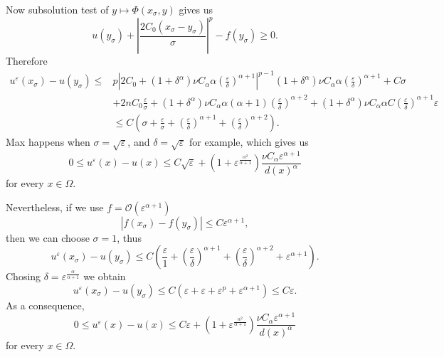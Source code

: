 \documentclass[10pt]{article}
\theoremstyle{plain}
\theoremstyle{remark}
\begin{document}
Now subsolution test of $y\mapsto \Phi(x_\sigma,y)$ gives us
\begin{equation*}
    u(y_\sigma) + \left|\frac{2C_0(x_\sigma-y_\sigma)}{\sigma}\right|^p -f(y_\sigma) \geq 0.
\end{equation*}
Therefore
\begin{equation*}
\begin{split}
    u^\varepsilon(x_\sigma) - u(y_\sigma) \leq & p\left|2C_0+(1+\delta^\alpha)\nu C_\alpha \alpha\left( \frac{\varepsilon}{\delta}\right)^{\alpha+1}\right|^{p-1}(1+\delta^\alpha) \nu C_\alpha \alpha \left(\frac{\varepsilon}{\delta}\right)^{\alpha+1} + C\sigma\\
    &+2nC_0\frac{\varepsilon}{\sigma} + (1+\delta^\alpha)\nu C_\alpha \alpha(\alpha+1)\left(\frac{\varepsilon}{\delta}\right)^{\alpha+2} + (1+\delta^\alpha)\nu C_\alpha \alpha C \left(\frac{\varepsilon}{\delta}\right)^{\alpha+1}\varepsilon\\
    &\leq C\left(\sigma + \frac{\varepsilon}{\sigma} + \left(\frac{\varepsilon}{\delta}\right)^{\alpha+1} + \left(\frac{\varepsilon}{\delta}\right)^{\alpha+2}\right).
\end{split}
\end{equation*}
Max happens when $\sigma = \sqrt{\varepsilon}$, and $\delta = \sqrt{\varepsilon}$ for example, which gives us
\begin{equation*}
   0\leq  u^\varepsilon(x) - u(x) \leq C\sqrt{\varepsilon} + \left(1+\varepsilon^{\frac{\alpha^2}{\alpha+1}}\right)\frac{\nu C_\alpha  \varepsilon^{\alpha+1}}{d(x)^\alpha} 
\end{equation*}
for every $x\in \Omega$.

\noindent
Nevertheless, if we use $f=\mathcal{O}(\varepsilon^{\alpha+1})$
\begin{equation*}
    |f(x_\sigma) - f(y_\sigma)| \leq C\varepsilon^{\alpha+1},
\end{equation*}
then we can choose $\sigma = 1$, thus
\begin{equation*}
    u^\varepsilon(x_\sigma) - u(y_\sigma) \leq C\left( \frac{\varepsilon}{1} + \left(\frac{\varepsilon}{\delta}\right)^{\alpha+1} + \left(\frac{\varepsilon}{\delta}\right)^{\alpha+2}+ \varepsilon^{\alpha+1}\right).
\end{equation*}
Chosing $\delta = \varepsilon^\frac{\alpha}{\alpha+1}$ we obtain 
\begin{equation*}
    u^\varepsilon(x_\sigma) - u(y_\sigma) \leq C(\varepsilon + \varepsilon + \varepsilon ^p + \varepsilon^{\alpha+1}) \leq C\varepsilon.
\end{equation*}
As a consequence, 
\begin{equation*}
   0\leq  u^\varepsilon(x) - u(x) \leq C\varepsilon + \left(1+\varepsilon^{\frac{\alpha^2}{\alpha+1}}\right)\frac{\nu C_\alpha  \varepsilon^{\alpha+1}}{d(x)^\alpha} 
\end{equation*}
for every $x\in \Omega$.
\end{document}
